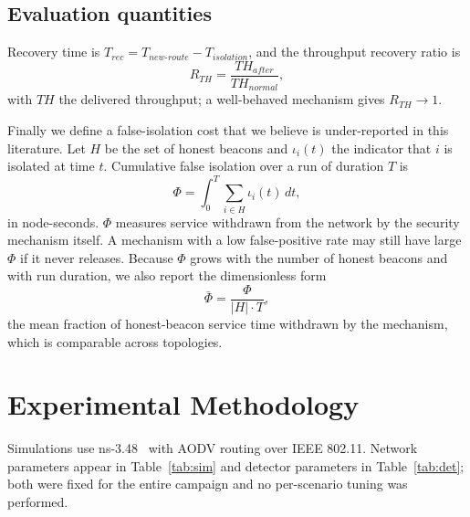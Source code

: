 \documentclass[pdflatex,sn-mathphys-num]{sn-jnl}%
\theoremstyle{thmstyleone}%
\theoremstyle{thmstyletwo}%
\theoremstyle{thmstylethree}%
\begin{document}
\subsection{Evaluation quantities}

Recovery time is $T_{rec} = T_{new\text{-}route} - T_{isolation}$, and the
throughput recovery ratio is
\begin{equation}
\label{eq:recov}
R_{TH} = \frac{TH_{after}}{TH_{normal}},
\end{equation}
with $TH$ the delivered throughput; a well-behaved mechanism gives
$R_{TH} \to 1$.

Finally we define a false-isolation cost that we believe is under-reported in
this literature. Let $H$ be the set of honest beacons and $\iota_i(t)$ the
indicator that $i$ is isolated at time $t$. Cumulative false isolation over a
run of duration $T$ is
\begin{equation}
\label{eq:Phi}
\Phi = \int_0^T \sum_{i \in H} \iota_i(t)\, dt,
\end{equation}
in node-seconds. $\Phi$ measures service withdrawn from the network by the
security mechanism itself. A mechanism with a low false-positive rate may
still have large $\Phi$ if it never releases. Because $\Phi$ grows with the
number of honest beacons and with run duration, we also report the
dimensionless form
\begin{equation}
\label{eq:Phibar}
\bar\Phi = \frac{\Phi}{|H| \cdot T},
\end{equation}
the mean fraction of honest-beacon service time withdrawn by the mechanism,
which is comparable across topologies.

\section{Experimental Methodology}
\label{sec:method}

Simulations use ns-3.48~\cite{ns3} with AODV routing over IEEE 802.11.
Network parameters appear in Table~\ref{tab:sim} and detector parameters in
Table~\ref{tab:det}; both were fixed for the entire campaign and no per-scenario
tuning was performed.
\end{document}
